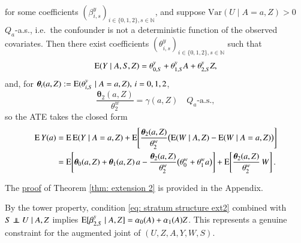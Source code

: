 \begin{theorem}[Extension 2]
\begin{enumerate}[label=\textup{(\alph*)}]
\begin{align}
\end{align}
for some coefficients $(\beta^y_{i,s})_{i \in \{0,1,2\}, s \in \mathbb{N}}$, and suppose $\mathrm{Var}(U \mid A=a,Z) > 0$ $Q_a$-a.s., i.e.\ the confounder is not a deterministic function of the observed covariates. Then there exist coefficients $(\theta^y_{i,s})_{i \in \{0,1,2\}, s \in \mathbb{N}}$ such that
\begin{align}
        \mathrm{E}(Y \mid A,S,Z) = \theta_{0,S}^{y} + \theta_{1,S}^{y} A + \theta_{2,S}^{y} Z, \label{eq: 2a.2}
\end{align}
and, for $\boldsymbol{\theta}_{i}(a,Z):=\mathrm{E}(\theta_{i,S}^{y}\mid A=a,Z),\, i=0,1,2$,
\[
\frac{\boldsymbol{\theta}_2(a,Z)}{\theta_2^w}=\gamma(a,Z) \quad Q_a\text{-a.s.},
\]
so the ATE takes the closed form
\begin{align}\label{eq: rewriting treatment effect}
\mathrm{E} \, Y(a) &=\mathrm{E}\,\mathrm{E}(Y\mid A=a,Z)
+\mathrm{E}\!\left[\frac{\boldsymbol{\theta}_2(a,Z)}{\theta_2^w}\big(\mathrm{E}(W\mid A,Z)-\mathrm{E}(W\mid A=a,Z)\big)\right] \nonumber\\
&= \mathrm{E}\!\left[\boldsymbol{\theta}_0(a,Z)+\boldsymbol{\theta}_1(a,Z)\,a-\frac{\boldsymbol{\theta}_2(a,Z)}{\theta_2^w}\big(\theta_0^w+\theta_1^w a\big)\right]
+\mathrm{E}\!\left[\frac{\boldsymbol{\theta}_2(a,Z)}{\theta_2^w}\,W\right].
\end{align}
\end{enumerate}
\end{theorem}

The \hyperlink{proof of thm extension 2}{proof} of Theorem \ref{thm: extension 2} is provided in the Appendix.

\begin{remark}
By the tower property, condition \eqref{eq: stratum structure ext2} combined with $S\independent U\mid A,Z$ implies $\mathrm{E}[\beta_{2,S}^y\mid A,Z]=\alpha_0(A)+\alpha_1(A)Z$. This represents a genuine constraint for the augmented joint of $(U,Z,A,Y,W,S)$.
\end{remark}

